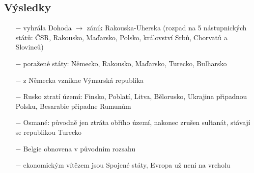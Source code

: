 \documentclass{article}
\begin{document}
\subsection*{Výsledky}
\begin{itemize}
    \vspace{-0.5em}
    \setlength\itemsep{0.15em}
    \item[$-$] vyhrála Dohoda $\rightarrow$ zánik Rakouska-Uherska (rozpad na 5 nástupnických států: ČSR, Rakousko, Maďarsko, Polsko, království Srbů, Chorvatů a Slovinců)
    \item[$-$] poražené státy: Německo, Rakousko, Maďarsko, Turecko, Bulharsko
    \item[$-$] z Německa vznikne Výmarská republika
    \item[$-$] Rusko ztratí území: Finsko, Poblatí, Litva, Bělorusko, Ukrajina připadnou Polsku, Besarabie připadne Rumunům
    \item[$-$] Osmané: původně jen ztráta obřího území, nakonec zrušen sultanát, stávají se republikou Turecko
    \item[$-$] Belgie obnovena v původním rozsahu
    \item[$-$] ekonomickým vítězem jsou Spojené státy, Evropa už není na vrcholu
\end{itemize}
\end{document}

